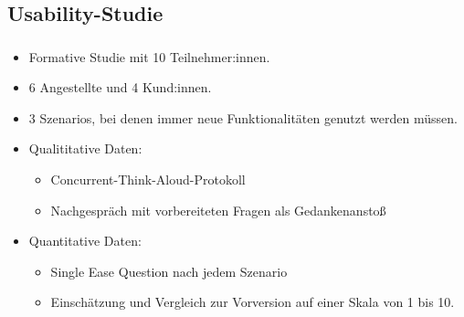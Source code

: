 \subsection{Usability-Studie}
\begin{frame}
  \frametitle{\currentsectionname}

  \begin{itemize}
    \item Formative Studie mit 10 Teilnehmer:innen.
    \item 6 Angestellte und 4 Kund:innen.
    \item 3 Szenarios, bei denen immer neue Funktionalitäten genutzt werden müssen.
    \item Qualititative Daten:
          \begin{itemize}
            \item Concurrent-Think-Aloud-Protokoll
            \item Nachgespräch mit vorbereiteten Fragen als Gedankenanstoß
          \end{itemize}
    \item Quantitative Daten:
          \begin{itemize}
            \item Single Ease Question nach jedem Szenario
            \item Einschätzung und Vergleich zur Vorversion auf einer Skala von 1 bis 10.
          \end{itemize}
  \end{itemize}


\end{frame}

